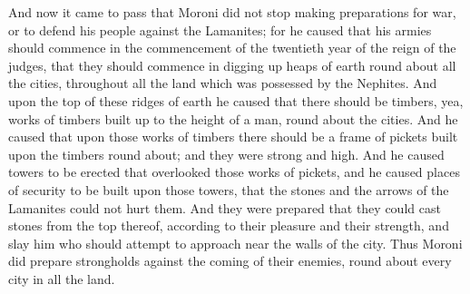 \bchapter
\bverse \iffalse And now it came to pass that Moroni did not stop making preparations for war, or to defend his people against the Lamanites; for he caused that his armies should commence in the commencement of the twentieth year of the reign of the judges, that they should commence in digging up heaps of earth round about all the cities, throughout all the land which was possessed by the Nephites. \fi
And now it came to pass that Moroni did not stop making preparations for war, or to defend his people against the Lamanites; for he caused that his armies should commence in the commencement of the twentieth year of the reign of the judges, that they should commence in digging up heaps of earth round about all the cities, throughout all the land which was possessed by the Nephites.
\bverse \iffalse And upon the top of these ridges of earth he caused that there should be timbers, yea, works of timbers built up to the height of a man, round about the cities. \fi
And upon the top of these ridges of earth he caused that there should be timbers, yea, works of timbers built up to the height of a man, round about the cities.
\bverse \iffalse And he caused that upon those works of timbers there should be a frame of pickets built upon the timbers round about; and they were strong and high. \fi
And he caused that upon those works of timbers there should be a frame of pickets built upon the timbers round about; and they were strong and high.
\bverse \iffalse And he caused towers to be erected that overlooked those works of pickets, and he caused places of security to be built upon those towers, that the stones and the arrows of the Lamanites could not hurt them. \fi
And he caused towers to be erected that overlooked those works of pickets, and he caused places of security to be built upon those towers, that the stones and the arrows of the Lamanites could not hurt them.
\bverse \iffalse And they were prepared that they could cast stones from the top thereof, according to their pleasure and their strength, and slay him who should attempt to approach near the walls of the city. \fi
And they were prepared that they could cast stones from the top thereof, according to their pleasure and their strength, and slay him who should attempt to approach near the walls of the city.
\bverse \iffalse Thus Moroni did prepare strongholds against the coming of their enemies, round about every city in all the land. \fi
Thus Moroni did prepare strongholds against the coming of their enemies, round about every city in all the land.
